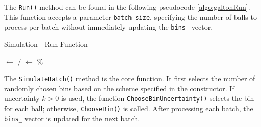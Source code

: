 \documentclass[a4paper, 11pt]{article}
\begin{document}
The \texttt{Run()} method can be found in the following pseudocode \ref{algo:galtonRun}.  This function accepts a parameter \texttt{batch\_size}, specifying the number of balls to process per batch without immediately updating the \texttt{bins\_} vector.
\begin{algorithm}[h]
    \caption{Simulation - Run Function}
    \label{algo:galtonRun}
    \SetAlgoLined  
    
    
    \BlankLine

    
    \FullBatches $\gets$ \NumberBalls / \BatchSize  \;
    \RemainingBalls $\gets$ \NumberBalls \% \BatchSize\;

    \BlankLine
    
    
\end{algorithm}

The \texttt{SimulateBatch()} method is the core function. It first selects the number of randomly chosen bins based on the scheme specified in the constructor. If uncertainty \(k > 0\) is used, the function \texttt{ChooseBinUncertainty()} selects the bin for each ball; otherwise, \texttt{ChooseBin()} is called. After processing each batch, the \texttt{bins\_} vector is updated for the next batch.
\end{document}
